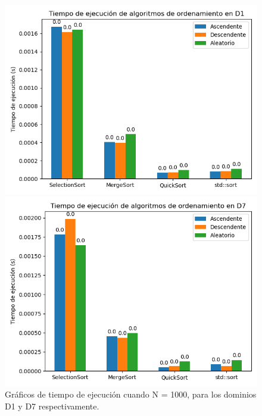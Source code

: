\begin{figure}[H]
    \centering
    \begin{minipage}[t]{0.5\textwidth}
        \includegraphics[width=\textwidth]{../code/sorting/data/plots/1000_D1.png}
    \end{minipage}%
    \begin{minipage}[t]{0.5\textwidth}
        \includegraphics[width=\textwidth]{../code/sorting/data/plots/1000_D7.png}
     \end{minipage}%
    \caption{Gráficos de tiempo de ejecución cuando N = 1000, para los dominios D1 y D7 respectivamente.}
    \label{fig:sortingN1000}
\end{figure}


